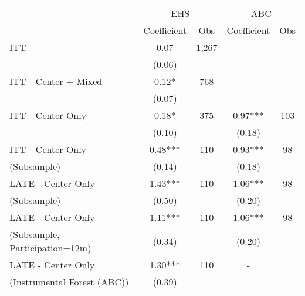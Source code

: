 \begin{tabular}{lcccc}
\toprule 
\midrule 
 & \multicolumn{2}{c}{EHS} & \multicolumn{2}{c}{ABC} \\
 \cmidrule(lr){2-3} \cmidrule(lr){4-5} 
 & Coefficient & Obs & Coefficient & Obs \\
\midrule 
ITT & 0.07 & 1,267 & - \\
 & (0.06) &  \\
ITT - Center $+$ Mixed & 0.12* & 768 & - \\
 & (0.07) &  \\
ITT - Center Only & 0.18* & 375 & 0.97*** & 103 \\
 & (0.10) &  & (0.18) &  \\
ITT - Center Only & 0.48*** & 110 & 0.93*** & 98 \\
(Subsample) & (0.14) &  & (0.18) &  \\
LATE - Center Only & 1.43*** & 110 & 1.06*** & 98 \\
(Subsample) & (0.50) &  & (0.20) &  \\
LATE - Center Only & 1.11*** & 110 & 1.06*** & 98 \\
(Subsample, Participation=12m) & (0.34) &  & (0.20) &  \\
LATE - Center Only & 1.30*** & 110 & - \\
(Instrumental Forest (ABC)) & (0.39) &  \\
\midrule 
\bottomrule 
\end{tabular}
